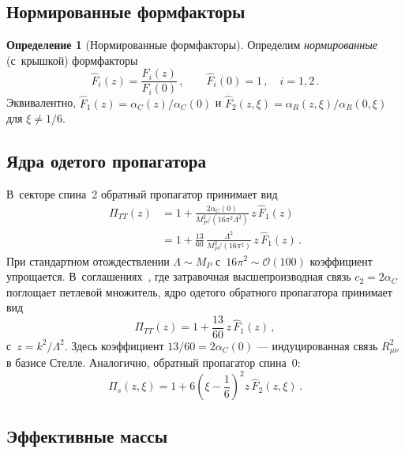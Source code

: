\documentclass[aps,prd,twocolumn,superscriptaddress,nofootinbib,floatfix]{revtex4-2}
\theoremstyle{definition}
\newtheorem{definition}[theorem]{\cyrillicfont Определение}
\theoremstyle{remark}
\begin{document}
\subsection{Нормированные формфакторы}

\begin{definition}[Нормированные формфакторы]
\label{def:Fhat}
Определим \emph{нормированные} (с~крышкой) формфакторы
\begin{equation}
  \hat{F}_i(z) = \frac{F_i(z)}{F_i(0)}\,,\qquad
  \hat{F}_i(0) = 1\,,\quad i = 1,2\,.
  \label{eq:Fhat-def}
\end{equation}
Эквивалентно, $\hat{F}_1(z) = \alpha_C(z)/\alpha_C(0)$ и
$\hat{F}_2(z,\xi) = \alpha_R(z,\xi)/\alpha_R(0,\xi)$ для $\xi \neq 1/6$.
\end{definition}

\subsection{Ядра одетого пропагатора}

В~секторе спина~2 обратный пропагатор принимает вид
\begin{align}
  \Pi_{TT}(z) &= 1 + \frac{2\alpha_C(0)}{M_P^2/(16\pi^2\Lambda^2)}\,
    z\,\hat{F}_1(z)
  \nonumber\\
  &= 1 + \frac{13}{60}\,\frac{\Lambda^2}{M_P^2/(16\pi^2)}\,z\,\hat{F}_1(z)\,.
  \label{eq:PiTT-full}
\end{align}
При стандартном отождествлении $\Lambda \sim M_P$ с~$16\pi^2 \sim \mathcal{O}(100)$ коэффициент упрощается.
В~соглашениях~\cite{Stelle:1976gc}, где затравочная высшепроизводная связь
$c_2 = 2\alpha_C$ поглощает петлевой множитель, ядро одетого обратного
пропагатора принимает вид
\begin{equation}
  \Pi_{TT}(z) = 1 + \frac{13}{60}\,z\,\hat{F}_1(z)\,,
  \label{eq:PiTT}
\end{equation}
с~$z = k^2/\Lambda^2$. Здесь коэффициент $13/60 = 2\alpha_C(0)$ ---
индуцированная связь $R_{\mu\nu}^2$ в базисе Стелле.
Аналогично, обратный пропагатор спина~0:
\begin{equation}
  \Pi_s(z,\xi) = 1 + 6\!\left(\xi - \frac{1}{6}\right)^{\!2}
    z\,\hat{F}_2(z,\xi)\,.
  \label{eq:Pis}
\end{equation}

\subsection{Эффективные массы}
\end{document}
